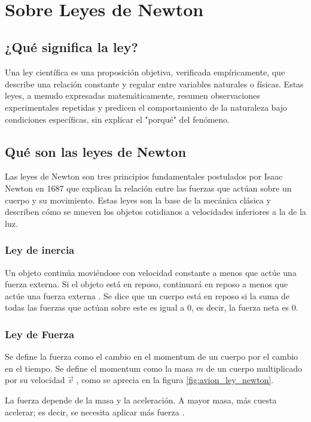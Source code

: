 \documentclass{article}
\begin{document}
\


\section{Sobre Leyes de Newton}

\subsection{¿Qué significa la ley?}
Una ley científica es una proposición objetiva, verificada empíricamente, que describe una relación constante y regular entre variables naturales o físicas. Estas leyes, a menudo expresadas matemáticamente, resumen observaciones experimentales repetidas y predicen el comportamiento de la naturaleza bajo condiciones específicas, sin explicar el "porqué" del fenómeno.

\subsection{Qué son las leyes de Newton}
Las leyes de Newton son tres principios fundamentales postulados por Isaac Newton en 1687 que explican la relación entre las fuerzas que actúan sobre un cuerpo y su movimiento. Estas leyes son la base de la mecánica clásica y describen cómo se mueven los objetos cotidianos a velocidades inferiores a la de la luz.

\subsubsection{Ley de inercia}
Un objeto continúa moviéndose con velocidad constante a menos que actúe una fuerza externa. Si el objeto está en reposo, continuará en reposo a menos que actúe una fuerza externa \cite{valdivia_fisica_cap3}. Se dice que un cuerpo está en reposo si la suma de todas las fuerzas que actúan sobre este es igual a 0, es decir, la fuerza neta es 0.

\subsubsection{Ley de Fuerza}
Se define la fuerza como el cambio en el momentum de un cuerpo por el cambio en el tiempo. Se define el momentum como la masa $m$ de un cuerpo multiplicado por su velocidad $\vec{v}$ \cite{nasa_newton_laws}, como se aprecia en la figura \ref{fig:avion_ley_newton}.

La fuerza depende de la masa y la aceleración. A mayor masa, más cuesta acelerar; es decir, se necesita aplicar más fuerza \cite{valdivia_fisica_cap3}.
\end{document}
